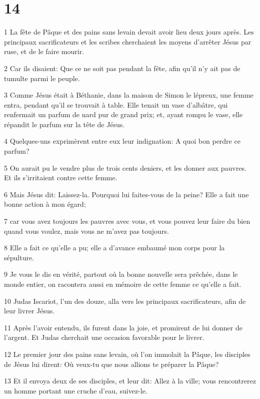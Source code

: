 \chapter{14}

\par 1 La fête de Pâque et des pains sans levain devait avoir lieu deux jours après. Les principaux sacrificateurs et les scribes cherchaient les moyens d'arrêter Jésus par ruse, et de le faire mourir.
\par 2 Car ils disaient: Que ce ne soit pas pendant la fête, afin qu'il n'y ait pas de tumulte parmi le peuple.
\par 3 Comme Jésus était à Béthanie, dans la maison de Simon le lépreux, une femme entra, pendant qu'il se trouvait à table. Elle tenait un vase d'albâtre, qui renfermait un parfum de nard pur de grand prix; et, ayant rompu le vase, elle répandit le parfum sur la tête de Jésus.
\par 4 Quelques-uns exprimèrent entre eux leur indignation: A quoi bon perdre ce parfum?
\par 5 On aurait pu le vendre plus de trois cents deniers, et les donner aux pauvres. Et ils s'irritaient contre cette femme.
\par 6 Mais Jésus dit: Laissez-la. Pourquoi lui faites-vous de la peine? Elle a fait une bonne action à mon égard;
\par 7 car vous avez toujours les pauvres avec vous, et vous pouvez leur faire du bien quand vous voulez, mais vous ne m'avez pas toujours.
\par 8 Elle a fait ce qu'elle a pu; elle a d'avance embaumé mon corps pour la sépulture.
\par 9 Je vous le dis en vérité, partout où la bonne nouvelle sera prêchée, dans le monde entier, on racontera aussi en mémoire de cette femme ce qu'elle a fait.
\par 10 Judas Iscariot, l'un des douze, alla vers les principaux sacrificateurs, afin de leur livrer Jésus.
\par 11 Après l'avoir entendu, ils furent dans la joie, et promirent de lui donner de l'argent. Et Judas cherchait une occasion favorable pour le livrer.
\par 12 Le premier jour des pains sans levain, où l'on immolait la Pâque, les disciples de Jésus lui dirent: Où veux-tu que nous allions te préparer la Pâque?
\par 13 Et il envoya deux de ses disciples, et leur dit: Allez à la ville; vous rencontrerez un homme portant une cruche d'eau, suivez-le.
